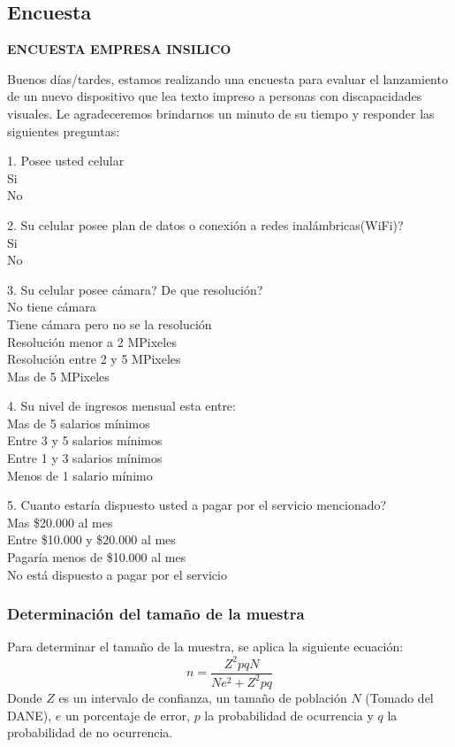 \documentclass[a4paper, 12pt, oneside]{article}
\begin{document}
	\subsection{Encuesta}
	\label{sec:encuesta}
	{\bf ENCUESTA EMPRESA INSILICO}
	
	Buenos días/tardes, estamos realizando una encuesta para evaluar el lanzamiento de un nuevo dispositivo que lea texto impreso a personas con discapacidades visuales. Le agradeceremos brindarnos un minuto de su tiempo y responder las siguientes preguntas:
	
	1. Posee usted celular \\
	Si \\
	No

	2. Su celular posee plan de datos o conexión a redes inalámbricas(WiFi)? \\
	Si \\
	No

	3. Su celular posee cámara? De que resolución? \\
	No tiene cámara \\
	Tiene cámara pero no se la resolución \\
	Resolución menor a 2 MPixeles \\
	Resolución entre 2 y 5 MPixeles  \\
	Mas de 5 MPixeles 

	4. Su nivel de ingresos mensual esta entre: \\
	Mas de 5 salarios mínimos \\
	Entre 3 y 5 salarios mínimos \\
	Entre 1 y 3 salarios mínimos \\
	Menos de 1 salario mínimo

	5. Cuanto estaría dispuesto usted a pagar por el servicio mencionado? \\
	Mas \$20.000 al mes \\
	Entre  \$10.000 y  \$20.000 al mes \\
	Pagaría menos de \$10.000 al mes \\
	No está dispuesto a pagar por el servicio
	
	\subsubsection{Determinación del tamaño de la muestra}
	Para determinar el tamaño de la muestra, se aplica la siguiente ecuación:
	\[n = \frac{Z^2pqN}{Ne^2 + Z^2pq} \]
	Donde $Z$ es un intervalo de confianza, un tamaño de población $N$ (Tomado del DANE), $e$ un porcentaje de error, $p$ la probabilidad de ocurrencia y $q$ la probabilidad de no ocurrencia.
	
\end{document}
